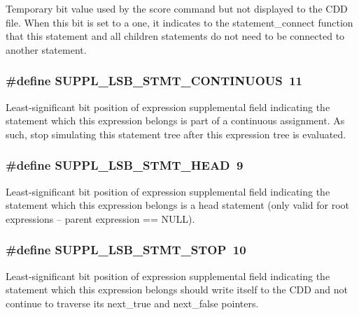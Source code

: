 Temporary bit value used by the score command but not displayed to the CDD file. When this bit is set to a one, it indicates to the statement\_\-connect function that this statement and all children statements do not need to be connected to another statement. 
\subsubsection{\setlength{\rightskip}{0pt plus 5cm}\#define SUPPL\_\-LSB\_\-STMT\_\-CONTINUOUS\ 11}\label{group__expr__suppl_a6}


Least-significant bit position of expression supplemental field indicating the statement which this expression belongs is part of a continuous assignment. As such, stop simulating this statement tree after this expression tree is evaluated. 
\subsubsection{\setlength{\rightskip}{0pt plus 5cm}\#define SUPPL\_\-LSB\_\-STMT\_\-HEAD\ 9}\label{group__expr__suppl_a4}


Least-significant bit position of expression supplemental field indicating the statement which this expression belongs is a head statement (only valid for root expressions -- parent expression == NULL). 
\subsubsection{\setlength{\rightskip}{0pt plus 5cm}\#define SUPPL\_\-LSB\_\-STMT\_\-STOP\ 10}\label{group__expr__suppl_a5}


Least-significant bit position of expression supplemental field indicating the statement which this expression belongs should write itself to the CDD and not continue to traverse its next\_\-true and next\_\-false pointers. 
